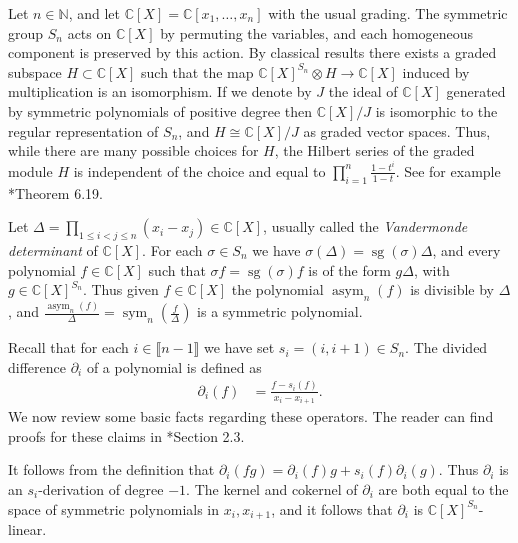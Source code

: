 \documentclass[11pt,fleqn]{article}
\newcommand\NN{\mathbb N}
\newcommand\CC{\mathbb C}
\newcommand\ot{\otimes}
\renewcommand\to{\longrightarrow}
\newcommand\interval[1]{\llbracket #1 \rrbracket}
\DeclareMathOperator\sym{sym}
\DeclareMathOperator\asym{asym}
\DeclareMathOperator\sg{sg}
\begin{document}
Let $n \in \NN$, and let $\CC[X] = \CC[x_1, \ldots, x_n]$ with the usual 
grading. The symmetric group $S_n$ acts on $\CC[X]$ by permuting the 
variables, and each homogeneous component is preserved by this action. By 
classical results there exists a graded subspace $H \subset \CC[X]$ such that 
the map $\CC[X]^{S_n} \ot H \to \CC[X]$ induced by multiplication is an 
isomorphism. If we denote by $J$ the ideal of $\CC[X]$ generated by symmetric 
polynomials of positive degree then $\CC[X]/J$ is isomorphic to the regular 
representation of $S_n$, and $H \cong \CC[X]/J$ as graded vector spaces.
Thus, while there are many possible choices for $H$, the Hilbert series of the 
graded module $H$ is independent of the choice and equal to $\prod_{i=1}^n
\frac{1-t^i}{1-t}$. See for example \cite{OT-arrangements-book}*{Theorem 6.19}.

Let $\Delta = \prod_{1 \leq i < j \leq n} (x_i - x_j) \in \CC[X]$, usually 
called the \emph{Vandermonde determinant} of $\CC[X]$. For each 
$\sigma \in S_n$ we have $\sigma(\Delta) = \sg(\sigma) \Delta$, and every 
polynomial $f \in \CC[X]$ such that $\sigma f = \sg(\sigma) f$ is of the form 
$g \Delta$, with $g \in \CC[X]^{S_n}$. Thus given $f \in \CC[X]$ the polynomial
$\asym_n(f)$ is divisible by $\Delta$, and $\frac{\asym_n(f)}{\Delta} = 
\sym_n\left(\frac{f}{\Delta}\right)$ is a symmetric polynomial.

Recall that for each $i \in \interval{n-1}$ we have set $s_i = (i,i+1) \in 
S_n$. The divided difference $\partial_{i}$ of a polynomial is defined as
\begin{align*}
\partial_{i}(f) 
  &= \frac{f - s_i(f)}{x_i - x_{i+1}}.
\end{align*}
We now review some basic facts regarding these operators. The reader can find proofs for these claims in \cite{Man-symm-book}*{Section 2.3}.

It follows from the definition that $\partial_{i}(fg) = \partial_{i}(f) g + 
s_i(f) \partial_{i}(g)$. Thus $\partial_{i}$ is an $s_i$-derivation 
of degree $-1$. The kernel and cokernel of $\partial_{i}$ are both equal to 
the space of symmetric polynomials in $x_i, x_{i+1}$, and it follows that
$\partial_i$ is $\CC[X]^{S_n}$-linear.
\end{document}
